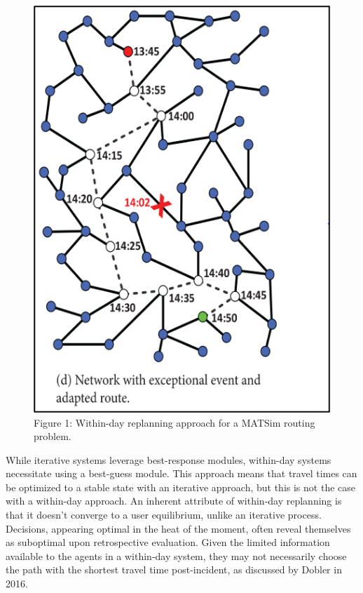 \documentclass[
  letterpaper,
  DIV=11,
  numbers=noendperiod]{scrreprt}
\begin{document}
\begin{figure}

{\centering \includegraphics{figures/fig1.png}

}

\caption{Figure 1: Within-day replanning approach for a MATSim routing
problem.}

\end{figure}

While iterative systems leverage best-response modules, within-day
systems necessitate using a best-guess module. This approach means that
travel times can be optimized to a stable state with an iterative
approach, but this is not the case with a within-day approach. An
inherent attribute of within-day replanning is that it doesn't converge
to a user equilibrium, unlike an iterative process. Decisions, appearing
optimal in the heat of the moment, often reveal themselves as suboptimal
upon retrospective evaluation. Given the limited information available
to the agents in a within-day system, they may not necessarily choose
the path with the shortest travel time post-incident, as discussed by
Dobler in 2016.
\end{document}
